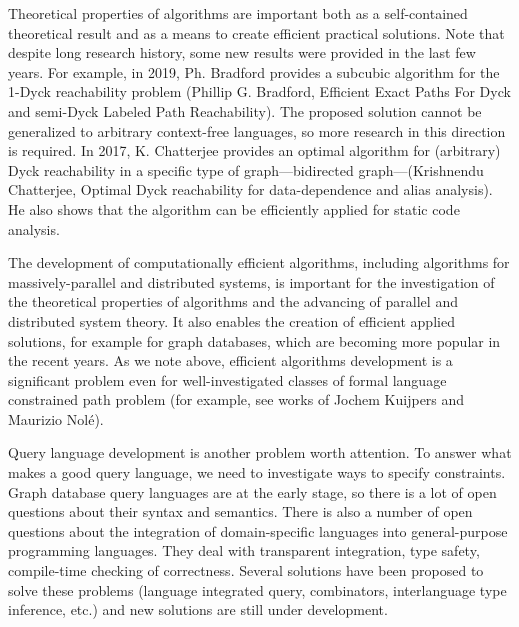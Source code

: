 \documentclass[12pt]{article}  %
\theoremstyle{remark}
\begin{document}
Theoretical properties of algorithms are important both as a self-contained theoretical result and as a means to create efficient practical solutions. Note that despite long research history, some new results were provided in the last few years. For example, in 2019, Ph. Bradford provides a subcubic algorithm for the 1-Dyck reachability problem (Phillip G. Bradford, Efficient Exact Paths For Dyck and semi-Dyck Labeled Path Reachability). The proposed solution cannot be generalized to arbitrary context-free languages, so more research in this direction is required. In 2017, K. Chatterjee provides an optimal algorithm for (arbitrary) Dyck reachability in a specific type of graph—bidirected graph—(Krishnendu Chatterjee, Optimal Dyck reachability for data-dependence and alias analysis). He also shows that the algorithm can be efficiently applied for static code analysis.

The development of computationally efficient algorithms, including algorithms for massively-parallel and distributed systems, is important for the investigation of the theoretical properties of algorithms and the advancing of parallel and distributed system theory. It also enables the creation of efficient applied solutions, for example for graph databases, which are becoming more popular in the recent years. As we note above, efficient algorithms development is a significant problem even for well-investigated classes of formal language constrained path problem (for example, see works of Jochem Kuijpers and Maurizio Nolé).

Query language development is another problem worth attention. To answer what makes a good query language, we need to investigate ways to specify constraints. Graph database query languages are at the early stage, so there is a lot of open questions about their syntax and semantics. There is also a number of open questions about the integration of domain-specific languages into general-purpose programming languages. They deal with transparent integration, type safety, compile-time checking of correctness. Several solutions have been proposed to solve these problems (language integrated query, combinators, interlanguage type inference, etc.) and new solutions are still under development.
\end{document}
